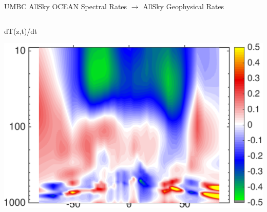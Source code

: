 \documentclass[10pt,t]{beamer}
\begin{document}
\begin{frame}{UMBC AllSky OCEAN Spectral Rates $\rightarrow$ AllSky Geophysical Rates}
\vspace{-0.35in}

\begin{columns}
\begin{column}{0.45\columnwidth}
\begin{block}{\footnotesize dT(z,t)/dt}
\vspace{-0.1in}
\begin{center}
\includegraphics[width=\linewidth]{Figs/CloudAnom/Desc_ocean/tz_lat_p_rates_from_obs_specral_rates.png}
\end{center}
\end{block}
\end{column}


\end{columns}
\end{frame}
\end{document}
